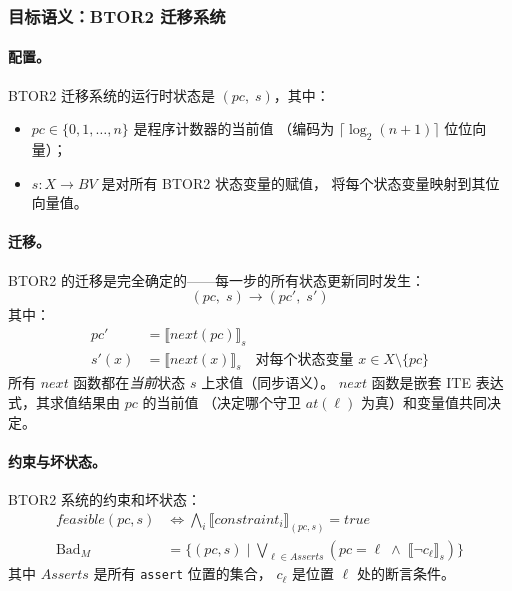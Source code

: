 \documentclass[11pt,a4paper]{article}
\begin{document}
\subsubsection{目标语义：BTOR2 迁移系统}
\label{sec:target-sem}

\paragraph{配置。}
BTOR2 迁移系统的运行时状态是 $(\mathit{pc},\; s)$，其中：
\begin{itemize}
\item $\mathit{pc} \in \{0, 1, \ldots, n\}$ 是程序计数器的当前值
（编码为 $\lceil \log_2(n{+}1) \rceil$ 位位向量）；
\item $s : X \to \mathit{BV}$ 是对所有 BTOR2 状态变量的赋值，
将每个状态变量映射到其位向量值。
\end{itemize}

\paragraph{迁移。}
BTOR2 的迁移是完全确定的——每一步的所有状态更新同时发生：
\[
(\mathit{pc},\; s) \to (\mathit{pc}',\; s')
\]
其中：
\begin{align*}
\mathit{pc}' &= \llbracket \mathit{next}(\mathit{pc}) \rrbracket_s \\
s'(x) &= \llbracket \mathit{next}(x) \rrbracket_s \quad \text{对每个状态变量 } x \in X \setminus \{\mathit{pc}\}
\end{align*}
所有 $\mathit{next}$ 函数都在\emph{当前}状态 $s$ 上求值（同步语义）。
$\mathit{next}$ 函数是嵌套 ITE 表达式，其求值结果由 $\mathit{pc}$ 的当前值
（决定哪个守卫 $\mathit{at}(\ell)$ 为真）和变量值共同决定。

\paragraph{约束与坏状态。}
BTOR2 系统的约束和坏状态：
\begin{align*}
\mathit{feasible}(\mathit{pc}, s) &\iff
  \bigwedge_i \llbracket \mathit{constraint}_i \rrbracket_{(\mathit{pc}, s)} = \mathit{true} \\
\mathrm{Bad}_M &= \{(\mathit{pc}, s) \mid
  \bigvee_{\ell \in \mathit{Asserts}} (\mathit{pc} = \ell \;\wedge\;
  \llbracket \neg c_\ell \rrbracket_s) \}
\end{align*}
其中 $\mathit{Asserts}$ 是所有 \texttt{assert} 位置的集合，
$c_\ell$ 是位置 $\ell$ 处的断言条件。
\end{document}
